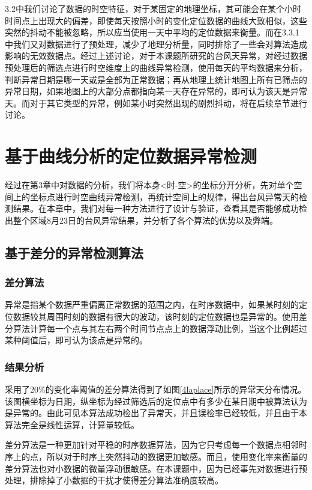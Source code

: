 \documentclass[a4paper,AutoFakeBold,oneside,12pt]{book}
\begin{document}
	3.2中我们讨论了数据的时空特征，对于某固定的地理坐标，其可能会在某个小时时间点上出现大的偏差，即使每天按照小时的变化定位数据的曲线大致相似，这些突然的抖动不能被忽略，所以应当使用一天中平均的定位数据来衡量。而在3.3.1中我们又对数据进行了预处理，减少了地理分析量，同时排除了一些会对算法造成影响的无效数据点。经过上述讨论，对于本课题所研究的台风天异常，对经过数据预处理后的筛选点进行时空维度上的曲线异常检测，使用每天的平均数据来分析，判断异常日期是哪一天或是全部为正常数据；再从地理上统计地图上所有已筛点的异常日期，如果地图上的大部分点都指向某一天存在异常的，即可认为该天是异常天。而对于其它类型的异常，例如某小时突然出现的剧烈抖动，将在后续章节进行讨论。


\chapter{基于曲线分析的定位数据异常检测}
	经过在第3章中对数据的分析，我们将本身<时-空>的坐标分开分析，先对单个空间上的坐标点进行时空曲线异常检测，再统计空间上的规律，得出台风异常天的检测结果。在本章中，我们对每一种方法进行了设计与验证，查看其是否能够成功检出整个区域8月23日的台风异常结果，并分析了各个算法的优势以及弊端。

\section{基于差分的异常检测算法}
\subsection{差分算法}
	异常是指某个数据严重偏离正常数据的范围之内，在时序数据中，如果某时刻的定位数据较其周围时刻的数据有很大的波动，该时刻的定位数据也是异常的。使用差分算法计算每一个点与其左右两个时间节点点上的数据浮动比例，当这个比例超过某种阈值后，即可认为该点是异常的。
\subsection{结果分析}
	采用了20\%的变化率阈值的差分算法得到了如图\ref{4laplace}所示的异常天分布情况。该图横坐标为日期，纵坐标为经过筛选后的定位点中有多少在某日期中被算法认为是异常的。由此可见本算法成功检出了异常天，并且误检率已经较低，并且由于本算法完全是线性运算，计算量较低。


	差分算法是一种更加针对平稳的时序数据算法，因为它只考虑每一个数据点相邻时序上的点，所以对于时序上突然抖动的数据更加敏感。而且，使用变化率来衡量的差分算法也对小数据的微量浮动很敏感。在本课题中，因为已经事先对数据进行预处理，排除掉了小数据的干扰才使得差分算法准确度较高。
\end{document}
